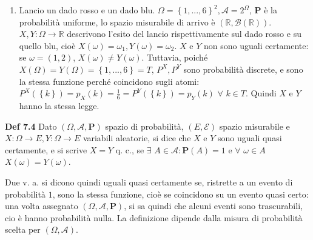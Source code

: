 \documentclass{article}
\begin{document}
\begin{enumerate}
\item Lancio un dado rosso e un dado blu. $\Omega =\left\{ 1,...,6\right\}
^{2},\mathcal{A}=2^{\Omega }$, $\mathbf{P}$ \`{e} la probabilit\`{a}
uniforme, lo spazio misurabile di arrivo \`{e} $\left( 
\mathbb{R}
,\mathcal{B}\left( 
\mathbb{R}
\right) \right) $. $X,Y:\Omega \rightarrow 
\mathbb{R}
$ descrivono l'esito del lancio rispettivamente sul dado rosso e su quello
blu, cio\`{e} $X\left( \omega \right) =\omega _{1},Y\left( \omega \right)
=\omega _{2}$. $X$ e $Y$ non sono uguali certamente: se $\omega =\left(
1,2\right) $, $X\left( \omega \right) \neq Y\left( \omega \right) $.
Tuttavia, poich\'{e} $X\left( \Omega \right) =Y\left( \Omega \right)
=\left\{ 1,...,6\right\} =T$, $P^{X},P^{Y}$ sono probabilit\`{a} discrete, e
sono la stessa funzione perch\'{e} coincidono sugli atomi: $P^{X}\left(
\left\{ k\right\} \right) =p_{X}\left( k\right) =\frac{1}{6}=P^{Y}\left(
\left\{ k\right\} \right) =p_{Y}\left( k\right) $ $\forall $ $k\in T$.
Quindi $X$ e $Y$ hanno la stessa legge.
\end{enumerate}

\textbf{Def 7.4} Dato $\left( \Omega ,\mathcal{A},\mathbf{P}\right) $ spazio
di probabilit\`{a}, $\left( E,\mathcal{E}\right) $ spazio misurabile e $%
X:\Omega \rightarrow E,Y:\Omega \rightarrow E$ variabili aleatorie, si dice
che $X$ e $Y$ sono uguali quasi certamente, e si scrive $X=Y$ q. c., se $%
\exists $ $A\in \mathcal{A}:\mathbf{P}\left( A\right) =1$ e $\forall $ $%
\omega \in A$ $X\left( \omega \right) =Y\left( \omega \right) $.

Due v. a. si dicono quindi uguali quasi certamente se, ristrette a un evento
di probabilit\`{a} $1$, sono la stessa funzione, cio\`{e} se coincidono su
un evento quasi certo: una volta assegnato $\left( \Omega ,\mathcal{A},%
\mathbf{P}\right) $, si sa quindi che alcuni eventi sono trascurabili, cio%
\`{e} hanno probabilit\`{a} nulla. La definizione dipende dalla misura di
probabilit\`{a} scelta per $\left( \Omega ,\mathcal{A}\right) $.
\end{document}
